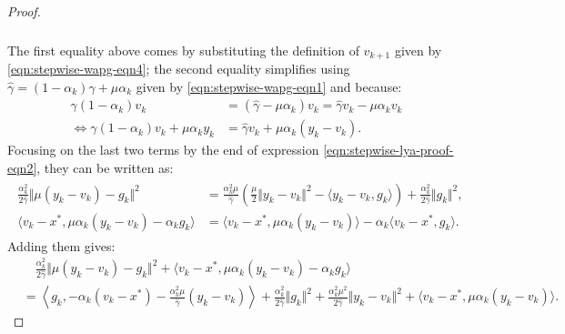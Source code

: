 \documentclass[12pt]{article}
\begin{document}
\begin{proof}
\begin{align}
\begin{split}
        \end{split}\end{align}
        The first equality above comes by substituting the definition of $v_{k + 1}$ given by \eqref{eqn:stepwise-wapg-eqn4}; the second equality simplifies using $\hat \gamma = (1 - \alpha_k)\gamma + \mu \alpha_k$ given by \eqref{eqn:stepwise-wapg-eqn1} and  because:
        \begin{align*}
            \gamma(1 - \alpha_k) v_k &=
            (\hat \gamma  - \mu \alpha_k)v_k
            = \hat \gamma v_k - \mu\alpha_k v_k
            \\
            \iff
            \gamma(1 - \alpha_k) v_k + \mu \alpha_k y_k
            &=
            \hat \gamma v_k + \mu \alpha_k(y_k - v_k).
        \end{align*}
        Focusing on the last two terms by the end of expression \eqref{eqn:stepwise-lya-proof-eqn2}, they can be written as:
        \begin{align}\label{eqn:stepwise-lya-proof-eqn2.1}\begin{split}
            \frac{\alpha^2_k}{2\hat \gamma}
            \Vert \mu(y_k - v_k) - g_k\Vert^2
            & =
            \frac{\alpha_k^2\mu}{\hat \gamma}
            \left(
                \frac{\mu}{2}\Vert y_k - v_k\Vert^2
                - \langle y_k - v_k, g_k\rangle
            \right)
            + \frac{\alpha_k^2}{2\hat \gamma}\Vert g_k\Vert^2,
            \\
            \langle v_k - x^*, \mu \alpha_k(y_k - v_k) - \alpha_k g_k\rangle
            &=
            \langle v_k - x^*, \mu\alpha_k(y_k - v_k)\rangle
            - \alpha_k \langle v_k - x^*, g_k\rangle.
        \end{split} %
        \end{align}
        Adding them gives:
        {\small
        \begin{align*}
            & \quad
            \frac{\alpha^2_k}{2\hat \gamma}
            \Vert \mu(y_k - v_k) - g_k\Vert^2
            +
            \langle v_k - x^*, \mu \alpha_k(y_k - v_k) - \alpha_k g_k\rangle
            \\
            &=
            \left\langle g_k,
                - \alpha_k(v_k - x^*)
                - \frac{\alpha_k^2\mu}{\hat \gamma}(y_k - v_k)
            \right\rangle
            + \frac{\alpha_k^2}{2\hat \gamma}\Vert g_k\Vert^2
            + \frac{\alpha_k^2 \mu^2}{2\hat \gamma}\Vert y_k - v_k\Vert^2
            + \langle v_k - x^*, \mu\alpha_k(y_k - v_k)\rangle.
        \end{align*}
}
\end{proof}
\end{document}
